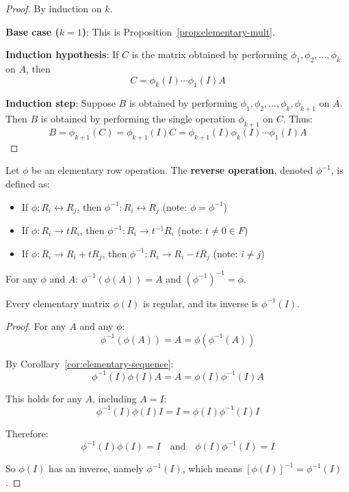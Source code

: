 \begin{proof}
    By induction on $k$.
    
    \textbf{Base case ($k=1$)}: This is Proposition~\ref{prop:elementary-mult}.
    
    \textbf{Induction hypothesis}: If $C$ is the matrix obtained by performing $\phi_1, \phi_2, \ldots, \phi_k$ on $A$, then
    \[
    C = \phi_k(I) \cdots \phi_1(I) A
    \]
    
    \textbf{Induction step}: Suppose $B$ is obtained by performing $\phi_1, \phi_2, \ldots, \phi_k, \phi_{k+1}$ on $A$. Then $B$ is obtained by performing the single operation $\phi_{k+1}$ on $C$. Thus:
    \[
    B = \phi_{k+1}(C) = \phi_{k+1}(I) C = \phi_{k+1}(I) \phi_k(I) \cdots \phi_1(I) A
    \]
\end{proof}

\begin{conclusion}\label{cncl:reverse-operation}
    Let $\phi$ be an elementary row operation. The \textbf{reverse operation}, denoted $\phi^{-1}$, is defined as:
    \begin{itemize}
        \item If $\phi: R_i \leftrightarrow R_j$, then $\phi^{-1}: R_i \leftrightarrow R_j$ (note: $\phi = \phi^{-1}$)
        \item If $\phi: R_i \to tR_i$, then $\phi^{-1}: R_i \to t^{-1}R_i$ (note: $t \neq 0 \in F$)
        \item If $\phi: R_i \to R_i + tR_j$, then $\phi^{-1}: R_i \to R_i - tR_j$ (note: $i \neq j$)
    \end{itemize}
    For any $\phi$ and $A$: $\phi^{-1}(\phi(A)) = A$ and $(\phi^{-1})^{-1} = \phi$.
\end{conclusion}

\begin{conclusion}\label{cncl:elementary-regular}
    Every elementary matrix $\phi(I)$ is regular, and its inverse is $\phi^{-1}(I)$.
\end{conclusion}

\begin{proof}
    For any $A$ and any $\phi$:
    \[
    \phi^{-1}(\phi(A)) = A = \phi(\phi^{-1}(A))
    \]
    
    By Corollary~\ref{cor:elementary-sequence}:
    \[
    \phi^{-1}(I) \phi(I) A = A = \phi(I) \phi^{-1}(I) A
    \]
    
    This holds for any $A$, including $A = I$:
    \[
    \phi^{-1}(I) \phi(I) I = I = \phi(I) \phi^{-1}(I) I
    \]
    
    Therefore:
    \[
    \phi^{-1}(I) \phi(I) = I \quad \text{and} \quad \phi(I) \phi^{-1}(I) = I
    \]
    
    So $\phi(I)$ has an inverse, namely $\phi^{-1}(I)$, which means $[\phi(I)]^{-1} = \phi^{-1}(I)$.
\end{proof}

